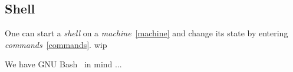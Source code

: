 \subsection{Shell}
\label{shell}

One can start a \emph{shell} on a \emph{machine}~\ref{machine} and change its state by entering \emph{commands}~\ref{commands}. wip


We have GNU Bash~\cite{bash} in mind ...